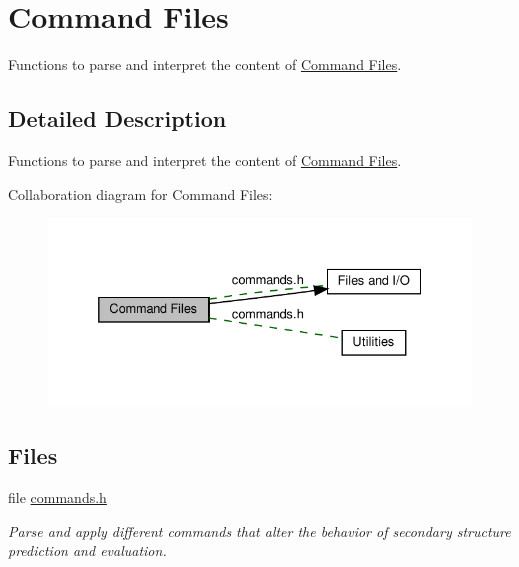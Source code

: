 \hypertarget{group__command__files}{}\section{Command Files}
\label{group__command__files}


Functions to parse and interpret the content of \hyperlink{file_formats_constraint-formats-file}{Command Files}.  




\subsection{Detailed Description}
Functions to parse and interpret the content of \hyperlink{file_formats_constraint-formats-file}{Command Files}. 

Collaboration diagram for Command Files\+:
\nopagebreak
\begin{figure}[H]
\begin{center}
\leavevmode
\includegraphics[width=332pt]{group__command__files}
\end{center}
\end{figure}
\subsection*{Files}
\begin{DoxyCompactItemize}
\item 
file \hyperlink{commands_8h}{commands.\+h}
\begin{DoxyCompactList}\small\item\em Parse and apply different commands that alter the behavior of secondary structure prediction and evaluation. \end{DoxyCompactList}\end{DoxyCompactItemize}
